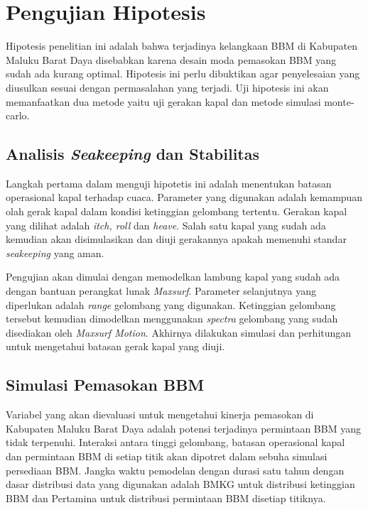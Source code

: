 \section{Pengujian Hipotesis}
\label{sec:uji-hipotesis}

Hipotesis penelitian ini adalah bahwa terjadinya kelangkaan BBM di Kabupaten Maluku Barat Daya disebabkan karena desain moda pemasokan BBM yang sudah ada kurang optimal. Hipotesis ini perlu dibuktikan agar penyelesaian yang diusulkan sesuai dengan permasalahan yang terjadi. Uji hipotesis ini akan memanfaatkan dua metode yaitu uji gerakan kapal dan metode simulasi monte-carlo.

\subsection{Analisis \emph{Seakeeping} dan Stabilitas}
\label{subsec:analisis-seakeeping}

Langkah pertama dalam menguji hipotetis ini adalah menentukan batasan operasional kapal terhadap cuaca. Parameter yang digunakan adalah kemampuan olah gerak kapal dalam kondisi ketinggian gelombang tertentu. Gerakan kapal yang dilihat adalah \textit{itch, roll} dan \emph{heave}. Salah satu kapal yang sudah ada kemudian akan disimulasikan dan diuji gerakannya apakah memenuhi standar \emph{seakeeping} yang aman.

Pengujian akan dimulai dengan memodelkan lambung kapal yang sudah ada dengan bantuan perangkat lunak \emph{Maxsurf}. Parameter selanjutnya yang diperlukan adalah \emph{range} gelombang yang digunakan. Ketinggian gelombang tersebut kemudian dimodelkan menggunakan \emph{spectra} gelombang yang sudah disediakan oleh \emph{Maxsurf Motion}. Akhirnya dilakukan simulasi dan perhitungan untuk mengetahui batasan gerak kapal yang diuji.

\subsection{Simulasi Pemasokan BBM}
\label{subsec:metode-simul-bbm}

Variabel yang akan dievaluasi untuk mengetahui kinerja pemasokan di Kabupaten Maluku Barat Daya adalah potensi terjadinya permintaan BBM yang tidak terpenuhi. Interaksi antara tinggi gelombang, batasan operasional kapal dan permintaan BBM di setiap titik akan dipotret dalam sebuha simulasi persediaan BBM. Jangka waktu pemodelan dengan durasi satu tahun dengan dasar distribusi data yang digunakan adalah BMKG untuk distribusi ketinggian BBM dan Pertamina untuk distribusi permintaan BBM disetiap titiknya.

